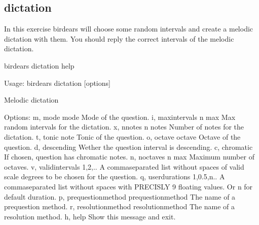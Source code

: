 \documentclass[letterpaper,10pt,english]{sphinxmanual}
\begin{document}
\subsection{dictation}
\label{\detokenize{index:dictation}}
In this exercise birdears will choose some random intervals and create a
melodic dictation with them. You should reply the correct intervals of the
melodic dictation.

%
\begin{sphinxVerbatim}[commandchars=\\\{\}]
birdears dictation \PYGZhy{}\PYGZhy{}help
\end{sphinxVerbatim}

%
\begin{sphinxVerbatim}[commandchars=\\\{\}]
Usage: birdears dictation [options]

  Melodic dictation

Options:
  \PYGZhy{}m, \PYGZhy{}\PYGZhy{}mode \PYGZlt{}mode\PYGZgt{}               Mode of the question.
  \PYGZhy{}i, \PYGZhy{}\PYGZhy{}max\PYGZus{}intervals \PYGZlt{}n max\PYGZgt{}     Max random intervals for the dictation.
  \PYGZhy{}x, \PYGZhy{}\PYGZhy{}n\PYGZus{}notes \PYGZlt{}n notes\PYGZgt{}         Number of notes for the dictation.
  \PYGZhy{}t, \PYGZhy{}\PYGZhy{}tonic \PYGZlt{}note\PYGZgt{}              Tonic of the question.
  \PYGZhy{}o, \PYGZhy{}\PYGZhy{}octave \PYGZlt{}octave\PYGZgt{}           Octave of the question.
  \PYGZhy{}d, \PYGZhy{}\PYGZhy{}descending                Wether the question interval is descending.
  \PYGZhy{}c, \PYGZhy{}\PYGZhy{}chromatic                 If chosen, question has chromatic notes.
  \PYGZhy{}n, \PYGZhy{}\PYGZhy{}n\PYGZus{}octaves \PYGZlt{}n max\PYGZgt{}         Maximum number of octaves.
  \PYGZhy{}v, \PYGZhy{}\PYGZhy{}valid\PYGZus{}intervals \PYGZlt{}1,2,..\PYGZgt{}  A comma\PYGZhy{}separated list without spaces
                                  of valid scale degrees to be chosen for the
                                  question.
  \PYGZhy{}q, \PYGZhy{}\PYGZhy{}user\PYGZus{}durations \PYGZlt{}1,0.5,n..\PYGZgt{}
                                  A comma\PYGZhy{}separated list without
                                  spaces with PRECISLY 9 floating values. Or
                                  \PYGZsq{}n\PYGZsq{} for default              duration.
  \PYGZhy{}p, \PYGZhy{}\PYGZhy{}prequestion\PYGZus{}method \PYGZlt{}prequestion\PYGZus{}method\PYGZgt{}
                                  The name of a pre\PYGZhy{}question method.
  \PYGZhy{}r, \PYGZhy{}\PYGZhy{}resolution\PYGZus{}method \PYGZlt{}resolution\PYGZus{}method\PYGZgt{}
                                  The name of a resolution method.
  \PYGZhy{}h, \PYGZhy{}\PYGZhy{}help                      Show this message and exit.


\end{sphinxVerbatim}
\end{document}
